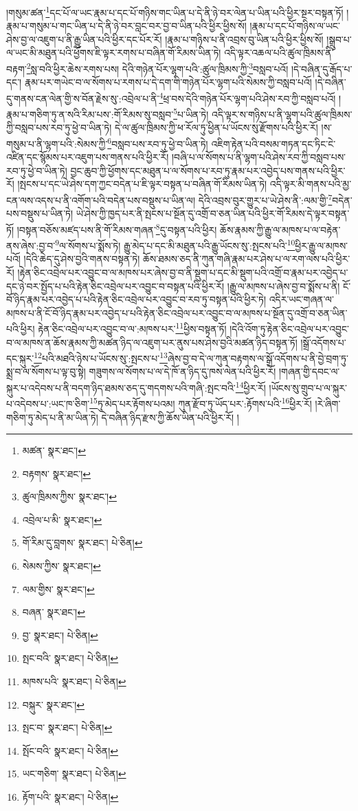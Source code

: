 །གསུམ་ཚན་\footnote{མཚན་  སྣར་ཐང་། }དང་པོ་ལ་ཡང་རྣམ་པ་དང་པོ་གཉིས་གང་ཡིན་པ་དེ་ནི་ཉེ་བར་ལེན་པ་ཡིན་པའི་ཕྱིར་སྔར་བསྟན་ཏོ། །རྣམ་པ་གསུམ་པ་གང་ཡིན་པ་དེ་ནི་ཉེ་བར་བླང་བར་བྱ་བ་ཡིན་པའི་ཕྱིར་ཕྱིས་སོ། །རྣམ་པ་དང་པོ་གཉིས་ལ་ཡང་ཤེས་བྱ་ལ་འཇུག་པ་ནི་རྒྱུ་ཡིན་པའི་ཕྱིར་དང་པོར་རོ། །རྣམ་པ་གཉིས་པ་ནི་འབྲས་བུ་ཡིན་པའི་ཕྱིར་ཕྱིས་སོ། །སྒྲུབ་པ་ལ་ཡང་མི་མཐུན་པའི་ཕྱོགས་ཇི་ལྟར་རགས་པ་བཞིན་གོ་རིམས་ཡིན་ཏེ། འདི་ལྟར་འཆལ་པའི་ཚུལ་ཁྲིམས་ནི་བརྟག་\footnote{བརྟགས་  སྣར་ཐང་། }སླ་བའི་ཕྱིར་ཆེས་རགས་པས། དེའི་གཉེན་པོར་ལྷག་པའི་:ཚུལ་ཁྲིམས་ཀྱི་\footnote{ཚུལ་ཁྲིམས་ཀྱིས་  སྣར་ཐང་། }བསླབ་པའོ། །དེ་བཞིན་དུ་རྒོད་པ་དང་། རྣམ་པར་གཡེང་བ་ལ་སོགས་པ་རགས་པ་དེ་དག་གི་གཉེན་པོར་ལྷག་པའི་སེམས་ཀྱི་བསླབ་པའོ། །དེ་བཞིན་དུ་གནས་ངན་ལེན་གྱི་ས་བོན་རྗེས་སུ་:འབྲེལ་པ་ནི་\footnote{འབྲེལ་པ་མི་  སྣར་ཐང་། }ཕྲ་བས་དེའི་གཉེན་པོར་ལྷག་པའི་ཤེས་རབ་ཀྱི་བསླབ་པའོ། །རྣམ་པ་གཅིག་ཏུ་ན་སའི་རིམ་པས་:གོ་རིམས་སུ་བསླབ་\footnote{གོ་རིམ་དུ་བླགས་  སྣར་ཐང་།  པེ་ཅིན། }པ་ཡིན་ཏེ། འདི་ལྟར་ས་གཉིས་པ་ནི་ལྷག་པའི་ཚུལ་ཁྲིམས་ཀྱི་བསླབ་པས་རབ་ཏུ་ཕྱེ་བ་ཡིན་ཏེ། དེ་ལ་ཚུལ་ཁྲིམས་ཀྱི་ཕ་རོལ་ཏུ་ཕྱིན་པ་ཡོངས་སུ་རྫོགས་པའི་ཕྱིར་རོ། །ས་གསུམ་པ་ནི་ལྷག་པའི་:སེམས་ཀྱི་\footnote{སེམས་ཀྱིས་  སྣར་ཐང་། }བསླབ་པས་རབ་ཏུ་ཕྱེ་བ་ཡིན་ཏེ། འཇིག་རྟེན་པའི་བསམ་གཏན་དང་ཏིང་ངེ་འཛིན་དང་སྙོམས་པར་འཇུག་པས་གནས་པའི་ཕྱིར་རོ། །བཞི་པ་ལ་སོགས་པ་ནི་ལྷག་པའི་ཤེས་རབ་ཀྱི་བསླབ་པས་རབ་ཏུ་ཕྱེ་བ་ཡིན་ཏེ། བྱང་ཆུབ་ཀྱི་ཕྱོགས་དང་མཐུན་པ་ལ་སོགས་པ་རབ་ཏུ་རྣམ་པར་འབྱེད་པས་གནས་པའི་ཕྱིར་རོ། །སྤངས་པ་དང་ཡེ་ཤེས་དག་ཀྱང་བདེན་པ་ཇི་ལྟར་བསྟན་པ་བཞིན་གོ་རིམས་ཡིན་ཏེ། འདི་ལྟར་མི་གནས་པའི་མྱ་ངན་ལས་འདས་པ་ནི་འགོག་པའི་བདེན་པས་བསྡུས་པ་ཡིན་ལ། དེའི་འབྲས་བུར་གྱུར་པ་ཡེ་ཤེས་ནི་:ལམ་གྱི་\footnote{ལམ་གྱིས་  སྣར་ཐང་། }བདེན་པས་བསྡུས་པ་ཡིན་ཏེ། ཡེ་ཤེས་ཀྱི་ཁྱད་པར་ནི་སྤངས་པ་སྔོན་དུ་འགྲོ་བ་ཅན་ཡིན་པའི་ཕྱིར་གོ་རིམས་དེ་ལྟར་བསྟན་ཏོ། །བསྟན་བཅོས་མཛད་པས་ནི་གོ་རིམས་གཞན་\footnote{བཞན་  སྣར་ཐང་། }དུ་བསྟན་པའི་ཕྱིར། ཆོས་རྣམས་ཀྱི་རྒྱུ་ལ་མཁས་པ་ལ་བརྟེན་ནས་ཞེས་:བྱ་བ་\footnote{བྱ་  སྣར་ཐང་།  པེ་ཅིན། }ལ་སོགས་པ་སྨོས་ཏེ། རྒྱུ་མེད་པ་དང་མི་མཐུན་པའི་རྒྱུ་ཡོངས་སུ་:སྤངས་པའི་\footnote{སྤང་བའི་  སྣར་ཐང་།  པེ་ཅིན། }ཕྱིར་རྒྱུ་ལ་མཁས་པའོ། །དེའི་ཆེད་དུ་ཤེས་བྱའི་གནས་བསྟན་ཏེ། ཆོས་ཐམས་ཅད་ནི་ཀུན་གཞི་རྣམ་པར་ཤེས་པ་ལ་རག་ལས་པའི་ཕྱིར་རོ། །རྟེན་ཅིང་འབྲེལ་པར་འབྱུང་བ་ལ་མཁས་པར་ཞེས་བྱ་བ་ནི་སྡུག་པ་དང་མི་སྡུག་པའི་འགྲོ་བ་རྣམ་པར་འབྱེད་པ་དང་ཉེ་བར་སྤྱོད་པ་པའི་རྟེན་ཅིང་འབྲེལ་པར་འབྱུང་བ་བསྟན་པའི་ཕྱིར་རོ། །རྒྱུ་ལ་མཁས་པ་ཞེས་བྱ་བ་སྨོས་པ་ནི། ངོ་བོ་ཉིད་རྣམ་པར་འབྱེད་པ་པའི་རྟེན་ཅིང་འབྲེལ་པར་འབྱུང་བ་རབ་ཏུ་བསྟན་པའི་ཕྱིར་ཏེ། འདིར་ཡང་གཞན་ལ་མཁས་པ་ནི་ངོ་བོ་ཉིད་རྣམ་པར་འབྱེད་པ་པའི་རྟེན་ཅིང་འབྲེལ་པར་འབྱུང་བ་ལ་མཁས་པ་སྔོན་དུ་འགྲོ་བ་ཅན་ཡིན་པའི་ཕྱིར། རྟེན་ཅིང་འབྲེལ་པར་འབྱུང་བ་ལ་:མཁས་པར་\footnote{མཁས་པའི་  སྣར་ཐང་།  པེ་ཅིན། }ཕྱིས་བསྟན་ཏོ། །དེའི་འོག་ཏུ་རྟེན་ཅིང་འབྲེལ་པར་འབྱུང་བ་ལ་མཁས་ན་ཆོས་རྣམས་ཀྱི་མཚན་ཉིད་ལ་འཇུག་པར་ནུས་པས་ཤེས་བྱའི་མཚན་ཉིད་བསྟན་ཏོ། །སྒྲོ་འདོགས་པ་དང་སྐུར་\footnote{བསྐུར་  སྣར་ཐང་། }པའི་མཐའི་ཉེས་པ་ཡོངས་སུ་:སྤངས་པ་\footnote{སྤང་བ་  སྣར་ཐང་།  པེ་ཅིན། }ཞེས་བྱ་བ་དེ་ལ་ཀུན་བརྟགས་ལ་སྒྲོ་འདོགས་པ་ནི་བྱེ་བྲག་ཏུ་སྨྲ་བ་ལ་སོགས་པ་ལྟ་བུ་སྟེ། གཟུགས་ལ་སོགས་པ་ལ་དེ་ཁོ་ན་ཉིད་དུ་ཁས་ལེན་པའི་ཕྱིར་རོ། །གཞན་གྱི་དབང་ལ་སྐུར་པ་འདེབས་པ་ནི་བདག་ཉིད་ཐམས་ཅད་དུ་གདགས་པའི་གཞི་:སྤང་བའི་\footnote{སྤོང་བའི་  སྣར་ཐང་།  པེ་ཅིན། }ཕྱིར་རོ། །ཡོངས་སུ་གྲུབ་པ་ལ་སྐུར་པ་འདེབས་པ་:ཡང་ཁ་ཅིག་\footnote{ཡང་གཅིག་  སྣར་ཐང་།  པེ་ཅིན། }ཏུ་མེད་པར་རྟོགས་པའམ། ཀུན་རྫོབ་ཏུ་ཡོད་པར་:རྟོགས་པའི་\footnote{རྟོག་པའི་  སྣར་ཐང་།  པེ་ཅིན། }ཕྱིར་རོ། །རེ་ཞིག་གཅིག་ཏུ་མེད་པ་ནི་མ་ཡིན་ཏེ། དེ་བཞིན་ཉིད་རྫས་ཀྱི་ཆོས་ཡིན་པའི་ཕྱིར་རོ། །
